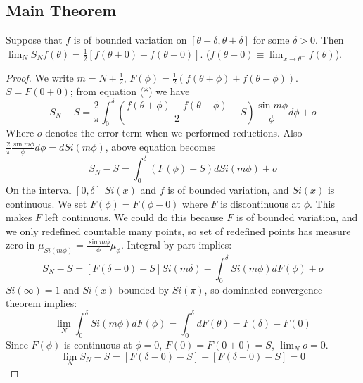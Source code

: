 \documentclass[12pt]{article}
\newenvironment{theorem}[1][Theorem.]{\begin{trivlist}
\item[\hskip \labelsep {\bfseries #1}]}{\end{trivlist}}
\begin{document}
\subsection*{Main Theorem}
\begin{theorem}
Suppose that $f$ is of bounded variation on $[\theta - \delta,\theta + \delta]$ for some $\delta > 0$. Then $\lim_NS_Nf(\theta) = \frac{1}{2}[f(\theta + 0)+ f(\theta - 0)].$ ($f(\theta + 0)\equiv \lim_{x\rightarrow \theta^+}f(\theta)$).
\end{theorem}
\begin{proof}
We write $m = N + \frac{1}{2}$, $F(\phi) = \frac{1}{2}(f(\theta+\phi)+f(\theta - \phi))$. $S = F(0 + 0)$; from equation (*) we have
\[
S_N - S = \frac{2}{\pi}\int_0^\delta(\frac{f(\theta+\phi)+f(\theta-\phi)}{2}-S)\frac{\sin m\phi}{\phi}d\phi + o
\]
Where $o$ denotes the error term when we performed reductions. Also $\frac{2}{\pi}\frac{\sin m\phi}{\phi}d\phi = dSi(m\phi)$, above equation becomes
\[
S_N - S = \int_0^\delta(F(\phi)-S)dSi(m\phi) + o
\]
On the interval $[0,\delta]$ $Si(x)$ and $f$ is of bounded variation, and $Si(x)$ is continuous. We set $F(\phi) = F(\phi - 0)$ where $F$ is discontinuous at $\phi$. This makes $F$ left continuous. We could do this because $F$ is of bounded variation, and we only redefined countable many points, so set of redefined points has measure zero in $\mu_{Si(m\phi)} = \frac{\sin m\phi}{\phi}\mu_{\phi}$. Integral by part implies:
\[
S_N - S = [F(\delta - 0)- S]Si(m\delta) - \int_0^\delta Si(m\phi)dF(\phi) + o
\]
$Si(\infty) = 1$ and $Si(x)$ bounded by $Si(\pi)$, so dominated convergence theorem implies:
\[
\lim_N \int_0^\delta Si(m\phi)dF(\phi) = \int_0^\delta dF(\theta) = F(\delta) - F(0)
\]
Since $F(\phi)$ is continuous at $\phi = 0$, $F(0) = F(0 + 0) = S$, $\lim_N o = 0$.
\[
\lim_N S_N - S = [F(\delta - 0)- S] - [F(\delta-0)-S] = 0
\]
\end{proof}
\end{document}
